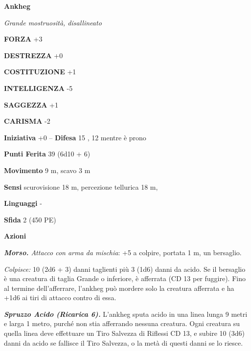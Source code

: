 \begin{multicols}{2}
\medskip{}\textbf{Ankheg}

\emph{Grande mostruosità, disallineato}

\textbf{FORZA} +3

\textbf{DESTREZZA} +0

\textbf{COSTITUZIONE} +1

\textbf{INTELLIGENZA} -5

\textbf{SAGGEZZA} +1

\textbf{CARISMA} -2

\textbf{Iniziativa} +0 -- \textbf{Difesa} 15 , 12 mentre è prono

\textbf{Punti Ferita} 39 (6d10 + 6)

\textbf{Movimento} 9 m, scavo 3 m

\textbf{Sensi} scurovisione 18 m, percezione tellurica 18 m, 

\textbf{Linguaggi} -

\textbf{Sfida} 2 (450 PE)

\textbf{Azioni}

\emph{\textbf{Morso.} Attacco con arma da mischia}: +5 a colpire, portata 1 m, un bersaglio.

\emph{Colpisce:} 10 (2d6 + 3) danni taglienti più 3 (1d6) danni da acido. Se il bersaglio è una creatura di taglia Grande o inferiore, è afferrata (CD 13 per fuggire). Fino al termine dell'afferrare, l'ankheg può mordere solo la creatura afferrata e ha +1d6 ai tiri di attacco contro di essa.

\emph{\textbf{Spruzzo Acido (Ricarica 6).}} L'ankheg sputa acido in una linea lunga 9 metri e larga 1 metro, purché non stia afferrando nessuna creatura. Ogni creatura su quella linea deve effettuare un Tiro Salvezza di Riflessi CD 13, e subire 10 (3d6) danni da acido se fallisce il Tiro Salvezza, o la metà di questi danni se lo riesce.


\end{multicols}
